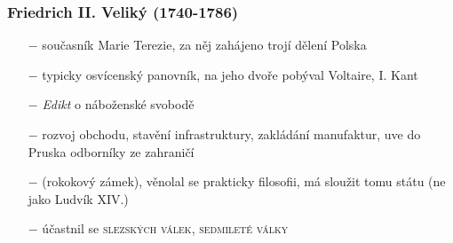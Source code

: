 \documentclass{article}
\begin{document}
\subsubsection*{Friedrich II. Veliký (1740-1786)}
\begin{itemize}
    \vspace{-0.5em}
    \setlength\itemsep{0.15em}
    \item[$-$] současník Marie Terezie, za něj zahájeno trojí dělení Polska
    \item[$-$] typicky osvícenský panovník, na jeho dvoře pobýval Voltaire, I. Kant
    \item[$-$] \textit{Edikt} o náboženské svobodě
    \item[$-$] rozvoj obchodu, stavění infrastruktury, zakládání manufaktur, uve do Pruska odborníky ze zahraničí
    \item[$-$]  (rokokový zámek), věnolal se prakticky filosofii, má sloužit tomu státu (ne jako Ludvík XIV.)
    \item[$-$] účastnil se \textsc{slezských válek}, \textsc{sedmileté války}
\end{itemize}
\end{document}
